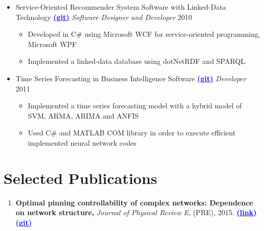 \documentclass[letter]{res}
\begin{document}
\begin{resume}
\begin{itemize}[leftmargin=-.1in]
			\item Service-Oriented Recommender System Software with Linked-Data Technology {\href{https://github.com/omid55/service_oriented_linked_data_based_recommender_system}{\textbf{\textcolor{blue}{(git)}}}}
			\newline
			{\sl Software Designer and Developer} \hfill 2010\\
			\vspace{-4mm}
			\iflong
			\begin{itemize}
				\item Developed in C\# using Microsoft WCF for service-oriented programming, Microsoft WPF
				\item Implemented a linked-data database using dotNetRDF and SPARQL
			\end{itemize}
			\fi
			
			\item Time Series Forecasting in Business Intelligence Software {\href{https://github.com/omid55/time_series_forecasting_business_intelligence}{\textbf{\textcolor{blue}{(git)}}}}
			\newline
			{\sl Developer} \hfill 2011\\
			\vspace{-4mm}
			\iflong
			\begin{itemize}
				\item Implemented a time series forecasting model with a hybrid model of SVM, ARMA, ARIMA and ANFIS
				\item Used C\# and MATLAB COM library in order to execute efficient implemented neural network codes
			\end{itemize}
			\fi
			
		\end{itemize}
		
		
		\section{Selected Publications}
		\begin{enumerate}[leftmargin=-.01in]
			\item \textbf{Optimal pinning controllability of complex networks: Dependence on network structure,} \textit{Journal of Physical Review E}, (PRE), 2015.
			\href{http://link.aps.org/doi/10.1103/PhysRevE.91.012803}{\textbf{\textcolor{blue}{(link)}}}
			{\href{https://github.com/omid55/optimal_pinning_control}{\textbf{\textcolor{blue}{(git)}}}}
			

\end{enumerate}
\end{resume}
\end{document}
